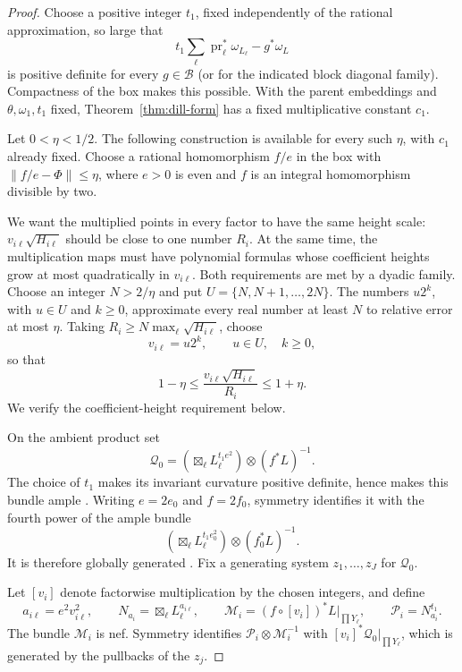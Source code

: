 \begin{proof}
Choose a positive integer $t_1$, fixed independently of the rational
approximation, so large that
\[
 t_1\sum_\ell\operatorname{pr}_\ell^*\omega_{L_\ell}-g^*\omega_L
\]
is positive definite for every $g\in\mathcal B$ (or for the indicated
block diagonal family).  Compactness of the box makes this possible.
With the parent embeddings and $\theta,\omega_1,t_1$ fixed,
Theorem~\ref{thm:dill-form} has a fixed multiplicative constant $c_1$.

Let $0<\eta<1/2$.  The following construction is available for every
such $\eta$, with $c_1$ already fixed.  Choose a rational homomorphism
$f/e$ in the box with $\|f/e-\Phi\|\le\eta$, where $e>0$ is even
and $f$ is an integral homomorphism divisible by two.

We want the multiplied points in every factor to have the same height
scale: $v_{i\ell}\sqrt{H_{i\ell}}$ should be close to one number $R_i$.
At the same time, the multiplication maps must have polynomial formulas
whose coefficient heights grow at most quadratically in $v_{i\ell}$.
Both requirements are met by a dyadic family.  Choose an integer
$N>2/\eta$ and put $U=\{N,N+1,\ldots,2N\}$.  The numbers $u2^k$,
with $u\in U$ and $k\ge0$, approximate every real number at least $N$
to relative error at most $\eta$.  Taking
$R_i\ge N\max_\ell\sqrt{H_{i\ell}}$, choose
\begin{equation}\label{eq:dyadic-multipliers}
 v_{i\ell}=u2^k,\qquad u\in U,\quad k\ge0,
\end{equation}
so that
\[
 1-\eta\le\frac{v_{i\ell}\sqrt{H_{i\ell}}}{R_i}\le1+\eta.
\]
We verify the coefficient-height requirement below.

On the ambient product set
\[
 \mathcal Q_0=\left(\boxtimes_\ell L_\ell^{t_1e^2}\right)
                           \otimes(f^*L)^{-1}.
\]
The choice of $t_1$ makes its invariant curvature positive definite,
hence makes this bundle ample
\cite[Theorem~1.1.4]{GenestierNgo2009}.  Writing $e=2e_0$ and
$f=2f_0$, symmetry identifies it with the fourth power of the ample
bundle
\[
 \left(\boxtimes_\ell L_\ell^{t_1e_0^2}\right)
                           \otimes(f_0^*L)^{-1}.
\]
It is therefore globally generated
\cite[Theorem~2.2.3]{GenestierNgo2009}. Fix a generating system
$z_1,\ldots,z_J$ for $\mathcal Q_0$.

Let $[v_i]$ denote factorwise multiplication by the chosen integers, and
define
\[
 a_{i\ell}=e^2v_{i\ell}^2,\qquad
 N_{a_i}=\boxtimes_\ell L_\ell^{a_{i\ell}},\qquad
 \mathcal M_i=(f\circ[v_i])^*L\big|_{\prod Y_\ell},\qquad
 \mathcal P_i=N_{a_i}^{t_1}.
\]
The bundle $\mathcal M_i$ is nef.  Symmetry identifies
$\mathcal P_i\otimes\mathcal M_i^{-1}$ with
$[v_i]^*\mathcal Q_0|_{\prod Y_\ell}$, which is generated by the
pullbacks of the $z_j$.


\end{proof}
